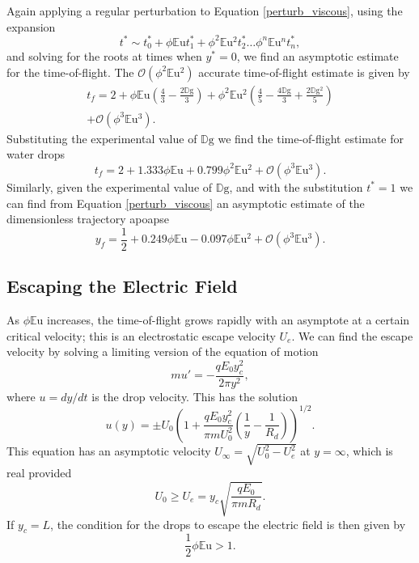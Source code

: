 \documentclass[aip,reprint, floatfix]{revtex4-1}
\begin{document}
Again applying a regular perturbation to Equation \ref{perturb_viscous}, using the expansion
\[ t^* \sim t^*_0 + \phi \mathbb{E}\mbox{u} t^*_1 + \phi^2 \mathbb{E}\mbox{u}^2 t^*_2 \ldots \phi^n \mathbb{E}\mbox{u}^n t^*_n  
,\]
and solving for the roots at times when $y^* = 0$, we find an asymptotic estimate for the time-of-flight. The $\mathcal{O}(\phi^2 \mathbb{E}\mbox{u}^2)$ accurate time-of-flight estimate is given by
\begin{gather*}
t_f = 2 + \phi \mathbb{E}\mbox{u} \left(\frac{4}{3} - \frac{2 \mathbb{D}\mbox{g}}{3}\right) 
+ \phi^2 \mathbb{E}\mbox{u}^{2} \left(\frac{4}{5} - \frac{4 \mathbb{D}\mbox{g}}{3} + \frac{2 \mathbb{D}\mbox{g}^{2}}{5}\right) \\
+ \mathcal{O}(\phi^3 \mathbb{E}\mbox{u}^3).
\end{gather*}
Substituting the experimental value of $\mathbb{D}\mbox{g}$ we find the time-of-flight estimate for water drops
\begin{equation} \label{time_of_flight}
t_f = 2 + 1.333 \phi \mathbb{E}\mbox{u} + 0.799 \phi^2 \mathbb{E}\mbox{u}^{2} + \mathcal{O}(\phi^3 \mathbb{E}\mbox{u}^3). 
\end{equation} 
Similarly, given the experimental value of $\mathbb{D}\mbox{g}$, and with the substitution $t^*=1$ we can find from Equation \ref{perturb_viscous} an asymptotic estimate of the dimensionless trajectory apoapse
\begin{equation} \label{dimless_apoapse}
y_f = \frac{1}{2} + 0.249 \phi \mathbb{E}\mbox{u} - 0.097 \phi \mathbb{E}\mbox{u}^{2} + \mathcal{O}(\phi^3 \mathbb{E}\mbox{u}^3).
\end{equation}

\subsection{Escaping the Electric Field}
As $\phi \mathbb{E}\mbox{u}$ increases, the time-of-flight grows rapidly with an asymptote at a certain critical velocity; this is an electrostatic escape velocity $U_e$. We can find the escape velocity by solving a limiting version of the equation of motion
\[ m u' = - \frac{q E_0 y_c^2}{2 \pi y^2}, \]
where $u = d y / d t$ is the drop velocity. This has the solution
\[ u(y) = \pm U_0 \left(1 + \frac{q E_0 y_c^2}{\pi m U_0^2} \left( \frac{1}{y} - \frac{1}{R_d} \right) \right)^{1/2}.
\]
This equation has an asymptotic velocity $U_{\infty} = \sqrt{U_0^2 - U_e^2}$ at $y = \infty$, which is real provided 
\[ U_0 \geq  U_e = y_c \sqrt{\frac{q E_0 }{\pi m R_d}}.
\]
If $y_c=L$, the condition for the drops to escape the electric field is then given by
\begin{equation}\label{escape}
\frac{1}{2} \phi \mathbb{E}\mbox{u} > 1.
\end{equation}
\end{document}
